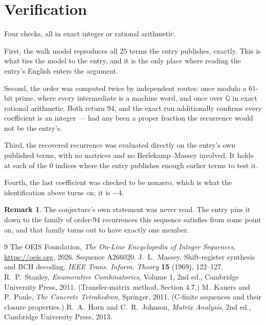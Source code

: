 \documentclass[11pt,a4paper]{article}
\theoremstyle{plain}
\theoremstyle{definition}
\newtheorem{remark}[theorem]{Remark}
\begin{document}
\section{Verification}

Four checks, all in exact integer or rational arithmetic.

First, the walk model reproduces all $25$ terms the entry publishes, exactly. This is
what ties the model to the entry, and it is the only place where reading the entry's English
enters the argument.

Second, the order was computed twice by independent routes: once modulo a $61$-bit prime, where
every intermediate is a machine word, and once over $\mathbb{Q}$ in exact rational arithmetic.
Both return $94$, and the exact run additionally confirms every coefficient is an integer
--- had any been a proper fraction the recurrence would not be the entry's.

Third, the recovered recurrence was evaluated directly on the entry's own published terms, with
no matrices and no Berlekamp--Massey involved. It holds at each of the $0$ indices where
the entry publishes enough earlier terms to test it.

Fourth, the last coefficient was checked to be nonzero, which is what the identification above
turns on; it is $-4$.

\begin{remark}
The conjecture's own statement was never read. The entry pins it down to the family of
order-$94$ recurrences this sequence satisfies from some point on, and that family turns
out to have exactly one member.
\end{remark}

\begin{thebibliography}{9}
 The OEIS Foundation, \emph{The On-Line Encyclopedia of Integer
Sequences}, \url{https://oeis.org}, 2026. Sequence A266020.
 J.~L.~Massey, Shift-register synthesis and BCH decoding, \emph{IEEE
Trans. Inform. Theory} \textbf{15} (1969), 122--127.
 R.~P.~Stanley, \emph{Enumerative Combinatorics}, Volume 1, 2nd ed.,
Cambridge University Press, 2011. (Transfer-matrix method, Section 4.7.)
 M.~Kauers and P.~Paule, \emph{The Concrete Tetrahedron}, Springer, 2011.
(C-finite sequences and their closure properties.)
 R.~A.~Horn and C.~R.~Johnson, \emph{Matrix Analysis}, 2nd ed., Cambridge
University Press, 2013.
\end{thebibliography}
\end{document}
